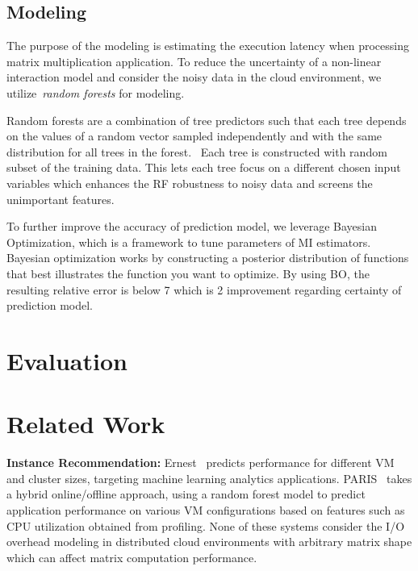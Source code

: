 \documentclass[10pt, conference, compsocconf]{IEEEtran}
\begin{document}
\subsection{Modeling}
The purpose of the modeling is estimating the execution latency when processing matrix multiplication application. To reduce the uncertainty of a non-linear interaction model and consider the noisy data in the cloud environment, we utilize~\textit{random forests} for modeling. 

Random forests are a combination of tree predictors such that each tree depends on the values of a random vector sampled independently and with the same distribution for all trees in the forest.~\cite{random-forest}  Each tree is constructed with random subset of the training data. This lets each tree focus on a different chosen input variables which enhances the RF robustness to noisy data and screens the unimportant features. 

To further improve the accuracy of prediction model, we leverage Bayesian Optimization, which is a framework to tune parameters of MI estimators.
Bayesian optimization works by constructing a posterior distribution of functions that best illustrates the function you want to optimize.
By using BO, the resulting relative error is below 7\text{\%} which is 2\text{\%} improvement regarding certainty of prediction model.

\section{Evaluation}{\label{eval}}

\section{Related Work}\label{sec:relatedwork}
\textbf{Instance Recommendation:} Ernest~\cite{ernest} predicts performance for different VM and cluster sizes, targeting machine learning analytics applications. PARIS~\cite{Yadwadkar:2017:SBV:3127479.3131614} takes a hybrid online/offline approach, using a random forest model to predict application performance on various VM configurations based on features such as CPU utilization obtained from profiling. None of these systems consider the I/O overhead modeling in distributed cloud environments with arbitrary matrix shape which can affect matrix computation performance. 
\end{document}
